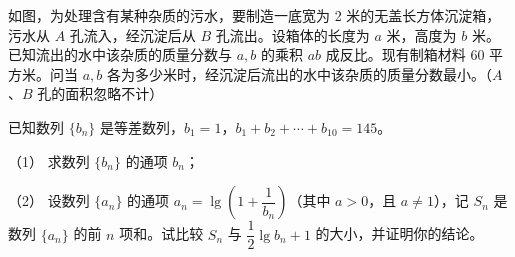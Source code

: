 \begin{question}
如图，为处理含有某种杂质的污水，要制造一底宽为 2 米的无盖长方体沉淀箱，污水从 $A$ 孔流入，经沉淀后从 $B$ 孔流出。设箱体的长度为 $a$ 米，高度为 $b$ 米。已知流出的水中该杂质的质量分数与 $a,b$ 的乘积 $ab$ 成反比。现有制箱材料 60 平方米。问当 $a,b$ 各为多少米时，经沉淀后流出的水中该杂质的质量分数最小。（$A$、$B$ 孔的面积忽略不计）
\nopagebreak[4]
\begin{center}\end{center}
\nopagebreak[4]
\end{question}
\begin{question}
已知数列 $\{b_n\}$ 是等差数列，$b_1=1$，$b_1+b_2+\cdots+b_{10}=145$。

（1） 求数列 $\{b_n\}$ 的通项 $b_n$；

（2） 设数列 $\{a_n\}$ 的通项 $a_n=\lg\left(1+\dfrac{1}{b_n}\right)$（其中 $a>0$，且 $a\ne 1$），记 $S_n$ 是数列 $\{a_n\}$ 的前 $n$ 项和。试比较 $S_n$ 与 $\dfrac12\lg b_n + 1$ 的大小，并证明你的结论。

\end{question}